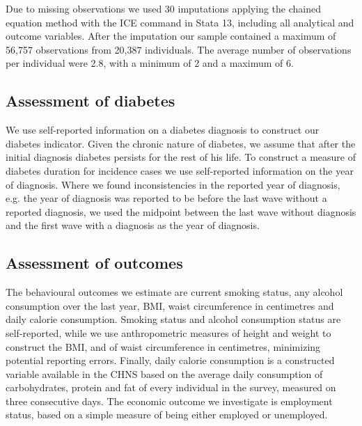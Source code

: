 Due to missing observations we used 30 imputations applying the chained equation method with the ICE command in Stata 13, including all analytical and outcome variables. After the imputation our sample contained a maximum of 56,757 observations from 20,387 individuals. The average number of observations per individual were 2.8, with a minimum of 2 and a maximum of 6.
 


\subsection*{Assessment of diabetes}

We use self-reported information on a diabetes diagnosis to construct our diabetes indicator. Given the chronic nature of diabetes, we assume that after the initial diagnosis diabetes persists for the rest of his life. To construct a measure of diabetes duration for incidence cases we use self-reported information on the year of diagnosis. Where we found inconsistencies in the reported year of diagnosis, e.g. the year of diagnosis was reported to be before the last wave without a reported diagnosis, we used the midpoint between the last wave without diagnosis and the first wave with a diagnosis as the year of diagnosis. 

\subsection*{Assessment of outcomes}

The behavioural outcomes we estimate are current smoking status, any alcohol consumption over the last year, \ac{BMI}, waist circumference in centimetres and daily calorie consumption. Smoking status and alcohol consumption status are self-reported, while we use anthropometric measures of height and weight to construct the \ac{BMI}, and of waist circumference in centimetres, minimizing potential reporting errors. Finally, daily calorie consumption is a constructed variable available in the \ac{CHNS} based on the average daily consumption of carbohydrates, protein and fat of every individual in the survey, measured on three consecutive days. The economic outcome we investigate is employment status, based on a simple measure of being either employed or unemployed.



